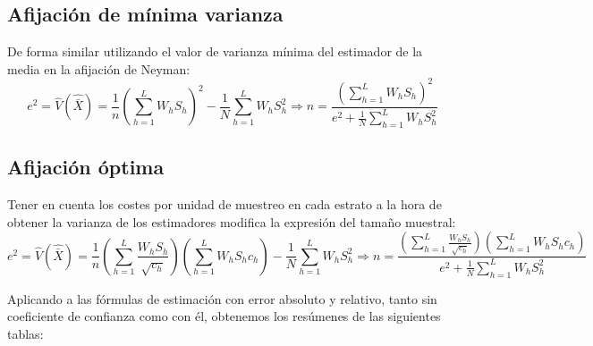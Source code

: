 \subsection{Afijación de mínima varianza}

De forma similar utilizando el valor de varianza mínima del estimador de la media en la afijación de Neyman:\\

\begin{equation}
    e^2 = \hat{V}(\hat{\bar{X}}) = \frac{1}{n}(\sum\limits_{h=1}^LW_hS_h)^2 -\frac{1}{N}\sum\limits_{h=1}^LW_hS_h^2 \Rightarrow n = \frac{(\sum\limits_{h=1}^LW_hS_h)^2}{e^2+\frac{1}{N}\sum\limits_{h=1}^LW_hS_h^2}
\end{equation}

\subsection{Afijación óptima}
Tener en cuenta los costes por unidad de muestreo en cada estrato a la hora de obtener la varianza de los estimadores modifica la expresión del tamaño muestral:\\

\begin{equation}
    e^2 = \hat{V}(\hat{\bar{X}}) = \frac{1}{n}(\sum\limits_{h=1}^L\frac{W_hS_h}{\sqrt{c_h}})(\sum\limits_{h=1}^LW_hS_hc_h)-\frac{1}{N}\sum\limits_{h=1}^LW_hS_h^2  \Rightarrow n = \frac{(\sum\limits_{h=1}^L\frac{W_hS_h}{\sqrt{c_h}})(\sum\limits_{h=1}^LW_hS_hc_h)}{e^2+\frac{1}{N}\sum\limits_{h=1}^LW_hS_h^2}
\end{equation}


Aplicando a las fórmulas de estimación con error absoluto y relativo, tanto sin coeficiente de confianza como con él, obtenemos los resúmenes de las siguientes tablas:\\


